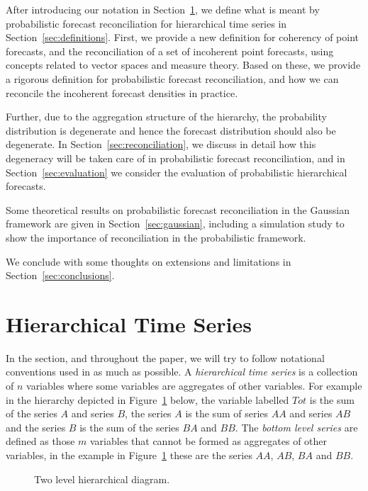\documentclass[a4paper, 11pt]{article}
\theoremstyle{theo}
\theoremstyle{definition}
\begin{document}
After introducing our notation in Section~\ref{sec:notation}, we define what is meant by probabilistic forecast reconciliation for hierarchical time series in Section~\ref{sec:definitions}. First, we provide a new definition for coherency of point forecasts, and the reconciliation of a set of incoherent point forecasts, using  concepts related to vector spaces and measure theory. Based on these, we provide a rigorous definition for probabilistic forecast reconciliation, and how we can reconcile the incoherent forecast densities in practice. 

Further, due to the aggregation structure of the hierarchy, the probability distribution is degenerate and hence the forecast distribution should also be degenerate. In Section~\ref{sec:reconciliation}, we discuss in detail how this degeneracy will be taken care of in probabilistic forecast reconciliation, and in Section~\ref{sec:evaluation} we consider the evaluation of probabilistic hierarchical forecasts. 

Some theoretical results on probabilistic forecast reconciliation in the Gaussian framework are given in Section~\ref{sec:gaussian}, including a simulation study to show the importance of reconciliation in the probabilistic framework. 

We conclude with some thoughts on extensions and limitations in Section~\ref{sec:conclusions}.


\section{Hierarchical Time Series}\label{sec:notation}

In the section, and throughout the paper, we will try to follow notational conventions used in \citet{Wickramasuriya2017} as much as possible.  A {\em hierarchical time series} is a collection of $n$ variables where some variables are aggregates of other variables.  For example in the hierarchy depicted in Figure~\ref{fig1} below, the variable labelled $Tot$ is the sum of the series $A$
and series $B$, the series $A$ is the sum of series $AA$ and series $AB$ and the series $B$ is the sum of the series $BA$ and $BB$.  The {\em bottom level series} are defined as those $m$ variables that cannot be formed as aggregates of other variables, in the example in Figure~\ref{fig1} these are the series $AA$, $AB$, $BA$ and $BB$. 

\begin{figure}[H]
  \begin{center}
      
     
    \qobitree
  \end{center}
  \caption{Two level hierarchical diagram.}\label{fig1}
\end{figure}
\end{document}
